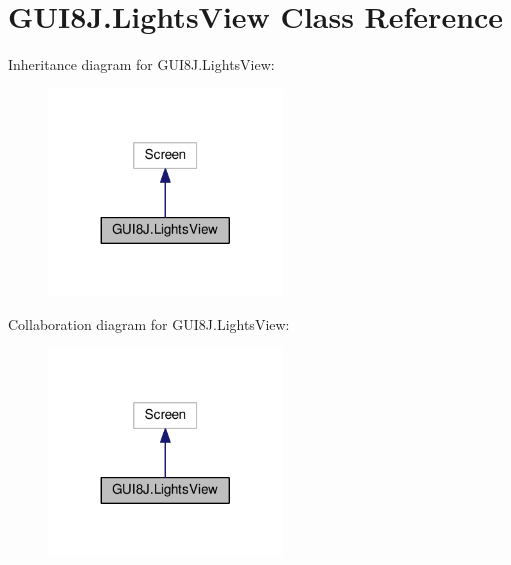 \hypertarget{classGUI8J_1_1LightsView}{}\section{G\+U\+I8\+J.\+Lights\+View Class Reference}
\label{classGUI8J_1_1LightsView}


Inheritance diagram for G\+U\+I8\+J.\+Lights\+View\+:\nopagebreak
\begin{figure}[H]
\begin{center}
\leavevmode
\includegraphics[width=176pt]{classGUI8J_1_1LightsView__inherit__graph}
\end{center}
\end{figure}


Collaboration diagram for G\+U\+I8\+J.\+Lights\+View\+:\nopagebreak
\begin{figure}[H]
\begin{center}
\leavevmode
\includegraphics[width=176pt]{classGUI8J_1_1LightsView__coll__graph}
\end{center}
\end{figure}
